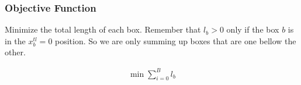 \documentclass[12pt, a4paper]{article}
\begin{document}
\subsubsection{Objective Function}

Minimize the total length of each box. Remember that $l_b > 0$ only if the box $b$ is in the $x_b^{tl} = 0$ position. So we are only summing up boxes that are one bellow the other.

\begin{subequations}
  \begin{align}
   \min \sum_{i=0}^B l_b
  \end{align}
\end{subequations}
\end{document}
